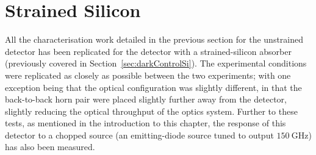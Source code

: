 \section{Strained Silicon}\label{sec:opticalStrainedSi}
All the characterisation work detailed in the previous section for the unstrained detector has been replicated for the detector with a strained-silicon absorber (previously covered in Section~\ref{sec:darkControlSi}). The experimental conditions were replicated as closely as possible between the two experiments; with one exception being that the optical configuration was slightly different, in that the back-to-back horn pair were placed slightly further away from the detector, slightly reducing the optical throughput of the optics system. Further to these tests, as mentioned in the introduction to this chapter, the response of this detector to a chopped source (an emitting-diode source tuned to output $150~\mathrm{GHz}$) has also been measured.
%
